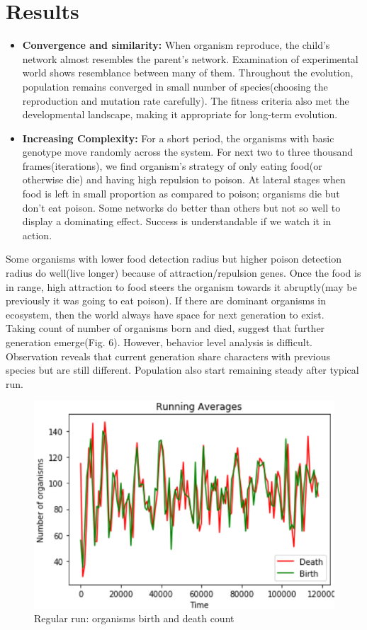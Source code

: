 \documentclass[conference]{IEEEtran}
\begin{document}
\section{Results}
\begin{itemize}
\item \textbf{Convergence and similarity:} When organism reproduce, the child's network almost resembles the parent's network. Examination of experimental world shows resemblance between many of them. Throughout the evolution, population remains converged in small number of species(choosing the reproduction and mutation rate carefully). The fitness criteria also met the developmental landscape, making it appropriate for long-term evolution.
\item \textbf{Increasing Complexity:} For a short period, the organisms with basic genotype move randomly across the system. For next two to three thousand frames(iterations), we find organism's strategy of only eating food(or otherwise die) and having high repulsion to poison. At lateral stages when food is left in small proportion as compared to poison; organisms die but don't eat poison. Some networks do better than others but not so well to display a dominating effect. Success is understandable if we watch it in action.
\end{itemize}
Some organisms with lower food detection radius but higher poison detection radius do well(live longer) because of attraction/repulsion genes. Once the food is in range, high attraction to food steers the organism towards it abruptly(may be previously it was going to eat poison). If there are dominant organisms in ecosystem, then the world always have space for next generation to exist.\\ Taking count of number of organisms born and died, suggest that further generation emerge(Fig. 6). However, behavior level analysis is difficult. Observation reveals that current generation share characters with previous species but are still different. Population also start remaining steady after typical run.
\begin{figure}
	\includegraphics[scale=0.55]{birth-and-death.png}
	\caption{Regular run: organisms birth and death count}
	\label{fig:birth-and-death}
\end{figure}
\end{document}
